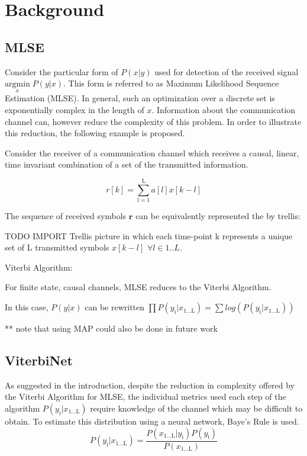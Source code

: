 \documentclass[12pt,a4paper]{report}
\begin{document}
\section{Background}

\subsection{MLSE}
Consider the particular form of $P(x|y)$ used for detection of the received signal 
$\underset{x}{\text{argmin}} \; P(y|x) $. This form is referred to as Maximum Likelihood Sequence Estimation (MLSE). In general, such an optimization over a discrete set is exponentially complex in the length of $x$. Information about the communication channel can, however reduce the complexity of this problem. In order to illustrate this reduction, the following example is proposed.
\par
Consider the receiver of a communication channel which receives a causal, linear, time invariant combination of a set of the transmitted information. 

\begin{equation}
r[k] = \sum_{\mathrm{l=1}}^{\mathrm{L}} a[l]x[k-l]
\end{equation}


The sequence of received symbols $\mathbf{r}$ can be equivalently represented the by trellis:

TODO IMPORT Trellis picture
in which each time-point k represents a unique set of L transmitted symbols 
$x[k-l]$ $ \forall l \in {1..L}$. 

Viterbi Algorithm:

For finite state, causal channels, MLSE reduces to the Viterbi Algorithm. 



In this case, $P(y|x)$ can be rewritten 
$\prod P(y_{\mathrm{i}}|x_{\mathrm{1 ... L}}) = \sum
log(P(y_{\mathrm{i}}|x_{\mathrm{1 ... L}}) )$


** note that using MAP could also be done in future work
\subsection{ViterbiNet}
As suggested in the introduction, despite the reduction in complexity offered by the Viterbi Algorithm for MLSE, the individual metrics used each step of the algorithm 
$P(y_{\mathrm{i}}|x_{\mathrm{1 ... L}}) $ require knowledge of the channel which may be difficult to obtain. To estimate this distribution using a neural network, Baye's Rule is used. 
\begin{equation}
P(y_{\mathrm{i}}|x_{\mathrm{1 ... L}}) = 
\frac
{P(x_{\mathrm{1 ... L}}|y_{\mathrm{i}})P(y_{\mathrm{i}})}
{P(x_{\mathrm{1 ... L}})}
\end{equation}
\end{document}

